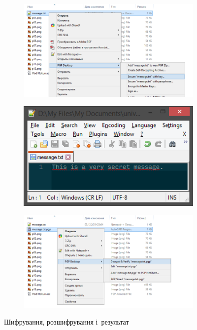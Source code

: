 \documentclass[
	a4paper,
	oneside,
	BCOR = 10mm,
	DIV = 12,
	12pt,
	headings = normal,
]{scrartcl}
\newlength{\gridunitwidth}
\begin{document}
		\begin{figure}[!htbp]
			\begin{subfigure}[b]{8 \gridunitwidth - 1em / (2-1)}
				\includegraphics[width = \columnwidth]{./assets/p13.png}
				\caption{}
				\label{subfig:enc}
			\end{subfigure}%
			\hspace{1em}%
			\begin{subfigure}[b]{4 \gridunitwidth - 1em / (2-1)}
				\includegraphics[width = \columnwidth]{./assets/p15.png}
				\caption{}
				\label{subfig:dec}
			\end{subfigure}
			\begin{subfigure}[b]{8 \gridunitwidth - 1em / (2-1)}
				\includegraphics[width = \columnwidth]{./assets/p14.png}
				\caption{}
				\label{subfig:dec}
			\end{subfigure}
			\caption{Шифрування, розшифрування і~результат}
			\label{fig:enc-dec-file}
		\end{figure}
\end{document}
